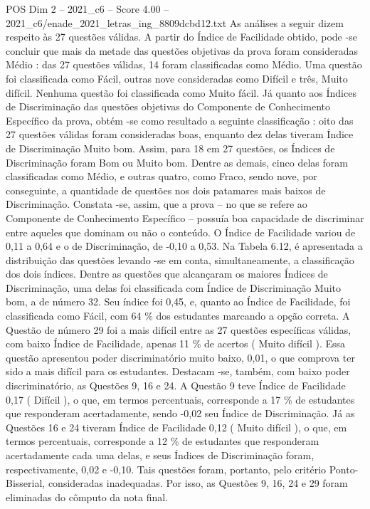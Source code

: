 \begin{textsample}{POS Dim 2 – 2021\_c6 – Score 4.00 – 2021\_c6/enade\_2021\_letras\_ing\_8809dcbd12.txt}
As análises a seguir dizem respeito às 27 questões válidas.
A partir do Índice de Facilidade obtido, pode -se concluir que mais da metade das questões objetivas da prova foram consideradas Médio : das 27 questões válidas, 14 foram classificadas como Médio.
Uma questão foi classificada como Fácil, outras nove consideradas como Difícil e três, Muito difícil.
Nenhuma questão foi classificada como Muito fácil.
Já quanto aos Índices de Discriminação das questões objetivas do Componente de Conhecimento Específico da prova, obtém -se como resultado a seguinte classificação : oito das 27 questões válidas foram consideradas boas, enquanto dez delas tiveram Índice de Discriminação Muito bom.
Assim, para 18 em 27 questões, os Índices de Discriminação foram Bom ou Muito bom.
Dentre as demais, cinco delas foram classificadas como Médio, e outras quatro, como Fraco, sendo nove, por conseguinte, a quantidade de questões nos dois patamares mais baixos de Discriminação.
Constata -se, assim, que a prova – no que se refere ao Componente de Conhecimento Específico – possuía boa capacidade de discriminar entre aqueles que dominam ou não o conteúdo.
O Índice de Facilidade variou de 0,11 a 0,64 e o de Discriminação, de -0,10 a 0,53.
Na Tabela 6.12, é apresentada a distribuição das questões levando -se em conta, simultaneamente, a classificação dos dois índices.
Dentre as questões que alcançaram os maiores Índices de Discriminação, uma delas foi classificada com Índice de Discriminação Muito bom, a de número 32.
Seu índice foi 0,45, e, quanto ao Índice de Facilidade, foi classificada como Fácil, com 64 \% dos estudantes marcando a opção correta.
A Questão de número 29 foi a mais difícil entre as 27 questões específicas válidas, com baixo Índice de Facilidade, apenas 11 \% de acertos ( Muito difícil ).
Essa questão apresentou poder discriminatório muito baixo, 0,01, o que comprova ter sido a mais difícil para os estudantes.
Destacam -se, também, com baixo poder discriminatório, as Questões 9, 16 e 24.
A Questão 9 teve Índice de Facilidade 0,17 ( Difícil ), o que, em termos percentuais, corresponde a 17 \% de estudantes que responderam acertadamente, sendo -0,02 seu Índice de Discriminação.
Já as Questões 16 e 24 tiveram Índice de Facilidade 0,12 ( Muito difícil ), o que, em termos percentuais, corresponde a 12 \% de estudantes que responderam acertadamente cada uma delas, e seus Índices de Discriminação foram, respectivamente, 0,02 e -0,10.
Tais questões foram, portanto, pelo critério Ponto-Bisserial, consideradas inadequadas.
Por isso, as Questões 9, 16, 24 e 29 foram eliminadas do cômputo da nota final.

\end{textsample}
